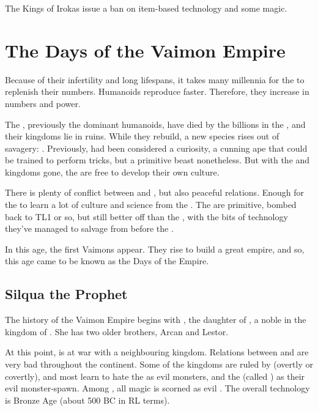 The Kings of Irokas issue a ban on item-based technology and some magic. 



\section{The Days of the Vaimon Empire}
\label{Days of the Vaimon Empire}
Because of their infertility and long lifespans, it takes many millennia for the \dragons{} to replenish their numbers. Humanoids reproduce faster. Therefore, they increase in numbers and power. 

The \scathae{}, previously the dominant humanoids, have died by the billions in the \Banewar, and their kingdoms lie in ruins. While they rebuild, a new species rises out of savagery: \Humans{}. Previously, \humans{} had been considered a curiosity, a cunning ape that could be trained to perform tricks, but a primitive beast nonetheless. But with the \draconic{} and \scathaese{} kingdoms gone, the \humans{} are free to develop their own culture. 

There is plenty of conflict between \humans{} and \scathae{}, but also peaceful relations. Enough for the \humans{} to learn a lot of culture and science from the \scathae{}. The \scathae{} are primitive, bombed back to TL1 or so, but still better off than the \humans{}, with the bits of technology they've managed to salvage from before the \Banewar. 

In this age, the first Vaimons appear. They rise to build a great empire, and so, this age came to be known as the Days of the Empire. 


\subsection{Silqua the Prophet}
The history of the Vaimon Empire begins with , the daughter of , a noble in the \human{} kingdom of \intro{\Imrath{}}. She has two older brothers, Arcan and Lestor. 

At this point, \Imrath{} is at war with a neighbouring \scathaese{} kingdom. Relations between \humans{} and \scathae{} are very bad throughout the continent. Some of the \scathaese{} kingdoms are ruled by \dragons{} (overtly or covertly), and most \humans{} learn to hate the \dragons{} as evil monsters, and the \scathae{} (called ) as their evil monster-spawn. Among \humans{}, all magic is scorned as evil \squo{\intro{\dragoncraft}}. The overall technology is Bronze Age (about 500 BC in RL terms). 

